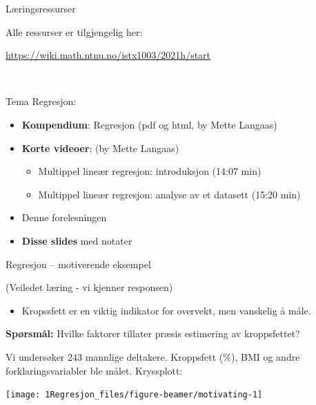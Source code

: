 \documentclass[10pt,ignorenonframetext,]{beamer}
\providecommand{\tightlist}{%
  \setlength{\itemsep}{0pt}\setlength{\parskip}{0pt}}
\begin{document}
\begin{frame}{Læringsressurser}
\protect\hypertarget{luxe6ringsressurser}{}

\vspace{2mm}

Alle ressurser er tilgjengelig her:

\url{https://wiki.math.ntnu.no/istx1003/2021h/start}

\(~\)

Tema Regresjon:

\vspace{2mm}

\begin{itemize}
\item
  \textbf{Kompendium}: Regresjon (pdf og html, by Mette Langaas)
\item
  \textbf{Korte videoer}: (by Mette Langaas)

  \begin{itemize}
  \tightlist
  \item
    Multippel lineær regresjon: introduksjon (14:07 min)
  \item
    Multippel lineær regresjon: analyse av et datasett (15:20 min)
  \end{itemize}
\item
  Denne forelesningen
\item
  \textbf{Disse slides} med notater
\end{itemize}

\end{frame}

\begin{frame}{Regresjon -- motiverende eksempel}
\protect\hypertarget{regresjon-motiverende-eksempel}{}

\centering\tiny(Veiledet læring - vi kjenner responsen)

\vspace{2mm}

\flushleft
\normalsize

\begin{itemize}
\tightlist
\item
  Kropssfett er en viktig indikator for overvekt, men vanskelig å måle.
\end{itemize}

\vspace{2mm}

\textbf{Spørsmål:} Hvilke faktorer tillater præsis estimering av
kroppsfettet?

\vspace{2mm}

Vi undersøker 243 mannlige deltakere. Kroppsfett (\%), BMI og andre
forklaringsvariabler ble målet. Kryssplott:

\begin{center}\texttt{[image: 1Regresjon\_files/figure-beamer/motivating-1]} \end{center}

\end{frame}
\end{document}
